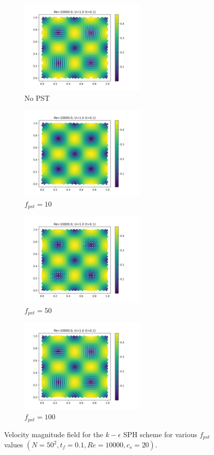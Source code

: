 \begin{figure}[H]
  \begin{subfigure}{7cm}
    \centering\includegraphics[width=6cm]{Code-Figures/keps/pst/c0_20_tait_pec_dtmul_1_nx_50_pst_-1_re_10000_k_eps/final_vmag.png}
    \caption{No PST}
  \end{subfigure}
  \begin{subfigure}{7cm}
    \centering\includegraphics[width=6cm]{Code-Figures/keps/pst/c0_20_tait_pec_dtmul_1_nx_50_pst_10_re_10000_k_eps/final_vmag.png}
    \caption{$f_{pst} = 10$}
  \end{subfigure}
  \begin{subfigure}{7cm}
    \centering\includegraphics[width=6cm]{Code-Figures/keps/pst/c0_20_tait_pec_dtmul_1_nx_50_pst_50_re_10000_k_eps/final_vmag.png}
    \caption{$f_{pst} = 50$}
  \end{subfigure}
  \begin{subfigure}{7cm}
    \centering\includegraphics[width=6cm]{Code-Figures/keps/pst/c0_20_tait_pec_dtmul_1_nx_50_pst_100_re_10000_k_eps/final_vmag.png}
    \caption{$f_{pst} = 100$}
  \end{subfigure}
  \caption{Velocity magnitude field for the $k-\epsilon$ SPH scheme for various $f_{pst}$ values $(N=50^2, t_f=0.1, Re=10000, c_s=20)$.}
  \label{fig:keps-pst-vmag}
\end{figure}

